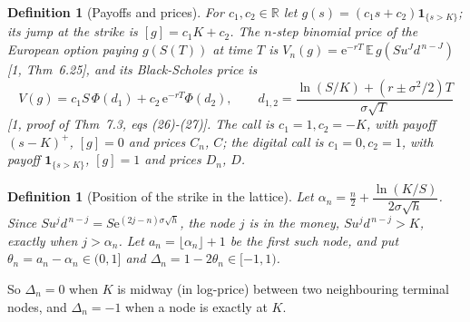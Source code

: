 \documentclass[11pt,a4paper]{article}
\theoremstyle{tight}
\theoremstyle{tightrm}
\newtheorem{defn}[thm]{Definition}
\newcommand{\R}{\mathbb{R}}
\newcommand{\e}{\mathrm{e}}
\newcommand{\one}{\mathbf{1}}
\begin{document}
\begin{defn}[Payoffs and prices]
For $c_1,c_2\in\R$ let $g(s)=(c_1s+c_2)\one_{\{s>K\}}$; its \emph{jump} at the strike is $[g]=c_1K+c_2$.
The $n$-step binomial price of the European option paying $g(S(T))$ at time $T$ is $V_n(g)=\e^{-rT}\,\mathbb{E}\,g(Su^Jd^{\,n-J})$ [1, Thm~6.25], and its Black-Scholes price is
\[
V(g)=c_1S\,\Phi(d_1)+c_2\,\e^{-rT}\Phi(d_2),\qquad
d_{1,2}=\frac{\ln(S/K)+(r\pm\sigma^2/2)T}{\sigma\sqrt T}
\]
[1, proof of Thm~7.3, eqs (26)-(27)]. The \emph{call} is $c_1=1,c_2=-K$, with payoff $(s-K)^+$, $[g]=0$
and prices $C_n$, $C$; the \emph{digital call} is $c_1=0,c_2=1$, with payoff $\one_{\{s>K\}}$, $[g]=1$ and prices $D_n$, $D$.
\end{defn}

\begin{defn}[Position of the strike in the lattice]
Let $\alpha_n=\tfrac n2+\dfrac{\ln(K/S)}{2\sigma\sqrt h}$. Since $Su^jd^{\,n-j}=S\e^{(2j-n)\sigma\sqrt h}$, the
node $j$ is in the money, $Su^jd^{\,n-j}>K$, exactly when $j>\alpha_n$. Let $a_n=\lfloor\alpha_n\rfloor+1$ be
the first such node, and put $\theta_n=a_n-\alpha_n\in(0,1]$ and $\Delta_n=1-2\theta_n\in[-1,1)$.
\end{defn}
So $\Delta_n=0$ when $K$ is midway (in log-price) between two neighbouring terminal nodes, and $\Delta_n=-1$ when a node is exactly at $K$.
\end{document}
